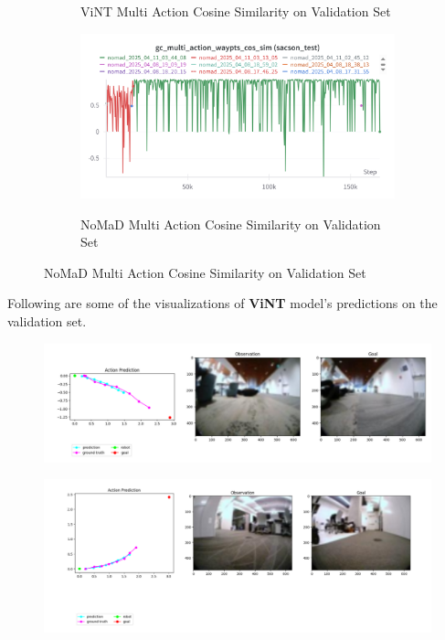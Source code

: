 \documentclass[12pt]{article}
\begin{document}
\begin{appendices}
\begin{figure}[H]
\begin{subfigure}[b]{0.48\textwidth}
        \label{fig:multiaction_test_vint}
        \caption{ViNT Multi Action Cosine Similarity on Validation Set}
    \end{subfigure}
    \hfill
    \begin{subfigure}[b]{0.48\textwidth}
        \centering
        \includegraphics[width=\textwidth]{images/gc_multi_action_waypts_cos_sim_test.png}
        \label{fig:multiaction_test_nomad}
        \caption{NoMaD Multi Action Cosine Similarity on Validation Set}
    \end{subfigure}
\end{figure}
\newpage
Following are some of the visualizations of \textbf{ViNT} model's predictions on the validation set.\\
\begin{figure}[H]
    \centering
    \includegraphics[width=\textwidth]{images/test_action_sample_vint.png}
    \label{fig:test_action_sample_vint}
\end{figure}
\begin{figure}[H]
    \centering
    \includegraphics[width=\textwidth]{images/test_action_sample_vint_2.png}
    \label{fig:test_action_sample_vint2}
\end{figure}
\newpage

\end{appendices}
\end{document}
